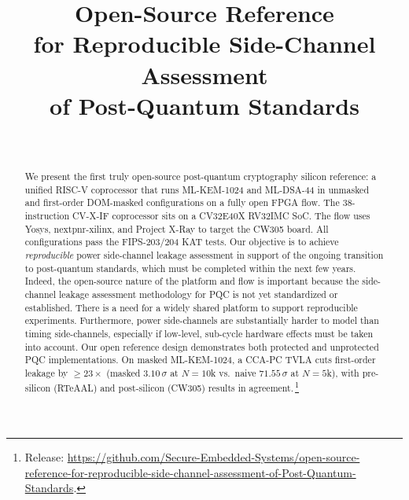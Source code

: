 \documentclass[10pt,conference]{IEEEtran}
\title{Open-Source Reference\\
for Reproducible Side-Channel Assessment \\
of Post-Quantum Standards}
\author{\IEEEauthorblockN{Dillibabu Shanmugam, Patrick Schaumont}\\
\IEEEauthorblockA{Worcester Polytechnic Institute, USA\quad\texttt{\{dshanmugam, pschaumont\}@wpi.edu}}}
\newcommand{\mlkem}{ML-KEM-1024\xspace}
\newcommand{\mldsa}{ML-DSA-44\xspace}
\begin{document}
\maketitle

\begin{abstract}

We present the first truly open-source post-quantum cryptography silicon reference: a unified RISC-V coprocessor that runs \mlkem and \mldsa
in unmasked and first-order DOM-masked
configurations on a fully open FPGA flow. The 38-instruction CV-X-IF coprocessor sits on a CV32E40X RV32IMC SoC. The flow uses Yosys, nextpnr-xilinx, and Project X-Ray to target the CW305 board.
All configurations pass the FIPS-203/204 KAT tests.
Our objective is to achieve {\em reproducible} power side-channel leakage assessment in support of the ongoing transition to post-quantum standards, which must be completed within the next few years.
Indeed, the open-source nature of the platform and flow is important because the side-channel leakage assessment methodology for PQC is not yet standardized or established. There is a need for a widely shared platform to support reproducible experiments. Furthermore, power side-channels are substantially harder to model than timing side-channels, especially if low-level, sub-cycle hardware effects must be taken into account. Our open reference design demonstrates both protected and unprotected PQC implementations. On masked \mlkem, a CCA-PC TVLA cuts first-order leakage by ${\geq}23\times$ (masked $3.10\,\sigma$ at $N{=}10$k vs.\ naive $71.55\,\sigma$ at $N{=}5$k), with pre-silicon (RTeAAL) and post-silicon (CW305) results in agreement.\,\footnote{Release: \url{https://github.com/Secure-Embedded-Systems/open-source-reference-for-reproducible-side-channel-assessment-of-Post-Quantum-Standards}.}
\end{abstract}
\end{document}
